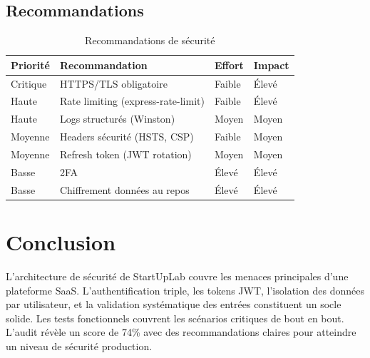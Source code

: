 \subsection{Recommandations}

\begin{table}[H]
\centering
\caption{Recommandations de sécurité}
\label{tab:recommandations}
\begin{tabular}{|l|l|l|l|}
\hline
\textbf{Priorité} & \textbf{Recommandation} & \textbf{Effort} & \textbf{Impact} \\
\hline
Critique & HTTPS/TLS obligatoire & Faible & Élevé \\
\hline
Haute & Rate limiting (express-rate-limit) & Faible & Élevé \\
\hline
Haute & Logs structurés (Winston) & Moyen & Moyen \\
\hline
Moyenne & Headers sécurité (HSTS, CSP) & Faible & Moyen \\
\hline
Moyenne & Refresh token (JWT rotation) & Moyen & Moyen \\
\hline
Basse & 2FA & Élevé & Élevé \\
\hline
Basse & Chiffrement données au repos & Élevé & Élevé \\
\hline
\end{tabular}
\end{table}

\section*{Conclusion}

L'architecture de sécurité de StartUpLab couvre les menaces principales d'une plateforme SaaS. L'authentification triple, les tokens JWT, l'isolation des données par utilisateur, et la validation systématique des entrées constituent un socle solide. Les tests fonctionnels couvrent les scénarios critiques de bout en bout. L'audit révèle un score de 74\% avec des recommandations claires pour atteindre un niveau de sécurité production.
